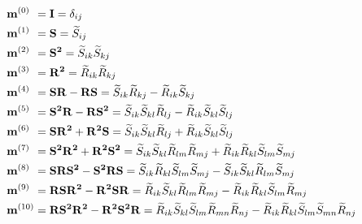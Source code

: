\begin{subequations}
\label{E:22} %
\begin{align}
 	\mathmakebox[\widthof{$\mathbf{m}^{(10)}$}][l]{\mathbf{m}^{(0)}} 
 	&= \mathbf{I} = \delta_{ij} \\
	\mathmakebox[\widthof{$\mathbf{m}^{(10)}$}][l]{\mathbf{m}^{(1)}} 
	&= \mathbf{S} = \widetilde{S}_{ij} \\
	\mathmakebox[\widthof{$\mathbf{m}^{(10)}$}][l]{\mathbf{m}^{(2)}} 
	&= \mathbf{S^2} = \widetilde{S}_{ik} \widetilde{S}_{kj} \\
	\mathmakebox[\widthof{$\mathbf{m}^{(10)}$}][l]{\mathbf{m}^{(3)}} 
	&= \mathbf{R^2} = \widetilde{R}_{ik} \widetilde{R}_{kj} \\
	\mathmakebox[\widthof{$\mathbf{m}^{(10)}$}][l]{\mathbf{m}^{(4)}}
	&= \mathbf{SR - RS} 
	= \widetilde{S}_{ik} \widetilde{R}_{kj} - \widetilde{R}_{ik} \widetilde{S}_{kj} \\
	\mathmakebox[\widthof{$\mathbf{m}^{(10)}$}][l]{\mathbf{m}^{(5)}} 
	&= \mathbf{S^2R - RS^2} 
	= 	\widetilde{S}_{ik} \widetilde{S}_{kl} \widetilde{R}_{lj} 
	-   \widetilde{R}_{ik} \widetilde{S}_{kl} \widetilde{S}_{lj} \\
	\mathmakebox[\widthof{$\mathbf{m}^{(10)}$}][l]{\mathbf{m}^{(6)}}
	&= \mathbf{SR^2 + R^2S} 
	= 	\widetilde{S}_{ik} \widetilde{S}_{kl} \widetilde{R}_{lj} 
	+   \widetilde{R}_{ik} \widetilde{S}_{kl} \widetilde{S}_{lj} \\
	\mathmakebox[\widthof{$\mathbf{m}^{(10)}$}][l]{\mathbf{m}^{(7)}}
	&= \mathbf{S^2R^2 + R^2S^2} 
	= 	\widetilde{S}_{ik} \widetilde{S}_{kl} \widetilde{R}_{lm} \widetilde{R}_{mj}  
	+   \widetilde{R}_{ik} \widetilde{R}_{kl} \widetilde{S}_{lm} \widetilde{S}_{mj} \\
	\mathmakebox[\widthof{$\mathbf{m}^{(10)}$}][l]{\mathbf{m}^{(8)}} 
	&= \mathbf{SRS^2 - S^2RS} 
	= 	\widetilde{S}_{ik} \widetilde{R}_{kl} \widetilde{S}_{lm} \widetilde{S}_{mj}  
	-   \widetilde{S}_{ik} \widetilde{S}_{kl} \widetilde{R}_{lm} \widetilde{S}_{mj} \\
	\mathmakebox[\widthof{$\mathbf{m}^{(10)}$}][l]{\mathbf{m}^{(9)}} 
	&= \mathbf{RSR^2 - R^2SR} 
	= 	\widetilde{R}_{ik} \widetilde{S}_{kl} \widetilde{R}_{lm} \widetilde{R}_{mj}  
	-   \widetilde{R}_{ik} \widetilde{R}_{kl} \widetilde{S}_{lm} \widetilde{R}_{mj} \\
	\mathmakebox[\widthof{$\mathbf{m}^{(10)}$}][l]{\mathbf{m}^{(10)}} 
	&= \mathbf{RS^2R^2 - R^2S^2R} 
	= 	\widetilde{R}_{ik} \widetilde{S}_{kl} \widetilde{S}_{lm} \widetilde{R}_{mn} \widetilde{R}_{nj} 
	-   \widetilde{R}_{ik} \widetilde{R}_{kl} \widetilde{S}_{lm} \widetilde{S}_{mn} \widetilde{R}_{nj}
\end{align}
\end{subequations}
%
%      
	  	
